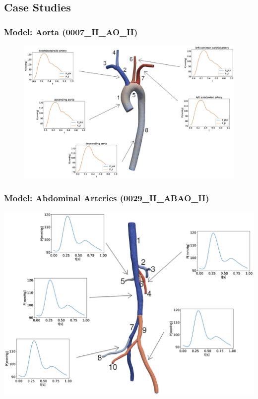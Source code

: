 \documentclass[compress]{beamer}
\begin{document}
\subsection{Case Studies}
\begin{frame}
	\frametitle{Model: Aorta (0007\_H\_AO\_H)}
	\begin{figure} [H]
		\centering
		\includegraphics[width=\columnwidth]{images/0007.eps}
		\label{fig:aorta}
	\end{figure}
\end{frame}
\begin{frame}
	\frametitle{Model: Abdominal Arteries (0029\_H\_ABAO\_H)}
	\includegraphics[width=\columnwidth]{images/0029.eps}
\end{frame}
\end{document}
